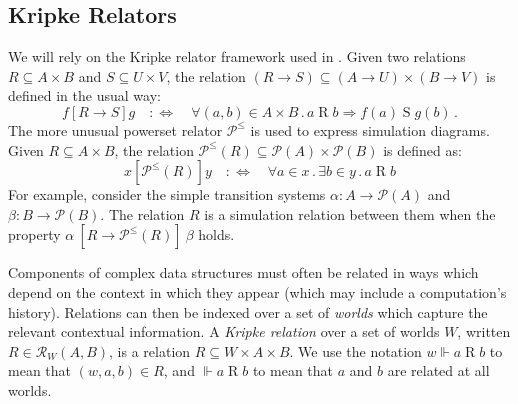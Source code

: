 \documentclass[acmsmall,screen,review,anonymous]{acmart}
\newcommand{\kw}[1]{\ensuremath{ \mathsf{#1} }}
\newcommand{\ifr}[1]{\mathrel{[{#1}]}}
\begin{document}


\subsection{Kripke Relators} %

We will rely on the Kripke relator framework
used in \citet{compcerto}.
Given two relations
$R \subseteq A \times B$ and
$S \subseteq U \times V$,
the relation
$(R \rightarrow S) \subseteq
 (A \rightarrow U) \times
 (B \rightarrow V)$
is defined in the usual way:
\[
  f \ifr{R \rightarrow S} g
  \quad:\Leftrightarrow\quad
  \forall (a, b) \in A \times B \mathbin.
    a \mathrel{R} b \Rightarrow
    f(a) \mathrel{S} g(b)
  \,.
\]
The more unusual powerset relator $\mathcal{P}^\le$
is used to express simulation diagrams.
Given $R \subseteq A \times B$,
the relation
$\mathcal{P}^\le(R) \subseteq \mathcal{P}(A) \times \mathcal{P}(B)$
is defined as:
\[
  x \ifr{\mathcal{P}^\le(R)} y
  \quad:\Leftrightarrow\quad
  \forall a \in x \mathbin.
  \exists b \in y \mathbin.
  a \mathrel{R} b
\]
For example,
consider the simple transition systems
$\alpha : A \rightarrow \mathcal{P}(A)$
and
$\beta : B \rightarrow \mathcal{P}(B)$.
The relation $R$ is a simulation relation between them
when the property
$
  \alpha \:\ifr{R \rightarrow \mathcal{P}^\le(R)}\: \beta
$
holds.

Components of complex data structures
must often be related in ways which depend
on the context in which they appear
(which may include a computation's history).
Relations can then be indexed over a set of \emph{worlds}
which capture the relevant contextual information.
A \emph{Kripke relation} over a set of worlds $W$,
written $R \in \mathcal{R}_W(A, B)$,
is a relation $R \subseteq W \times A \times B$.
We use the notation
$
  w \Vdash a \mathrel{R} b
$
to mean that $(w, a, b) \in R$,
and
$\Vdash a \mathrel{R} b$
to mean that $a$ and $b$ are related at all worlds.
\end{document}
